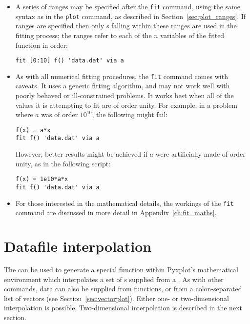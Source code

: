 \begin{itemize}
\item A series of ranges may be specified after the {\tt fit} command, using
the same syntax as in the {\tt plot} command, as described in
Section~\ref{sec:plot_ranges}. If ranges are specified then only \datapoint s
falling within these ranges are used in the fitting process; the ranges refer
to each of the $n$ variables of the fitted function in order:
\begin{verbatim}
fit [0:10] f() 'data.dat' via a
\end{verbatim}

\item As with all numerical fitting procedures, the {\tt fit} command comes
with caveats. It uses a generic fitting algorithm, and may not work well with
poorly behaved or ill-constrained problems. It works best when all of the
values it is attempting to fit are of order unity. For example, in a problem
where $a$ was of order $10^{10}$, the following might fail:
\begin{verbatim}
f(x) = a*x
fit f() 'data.dat' via a
\end{verbatim}
However, better results might be achieved if $a$ were artificially made of
order unity, as in the following script:
\begin{verbatim}
f(x) = 1e10*a*x
fit f() 'data.dat' via a
\end{verbatim}

\item For those interested in the mathematical details, the workings of the
{\tt fit} command are discussed in more detail in Appendix~\ref{ch:fit_maths}.

\end{itemize}

\section{Datafile interpolation}
\label{sec:spline_command}

The  can be used to generate a special function within
Pyxplot's mathematical environment which interpolates a set of \datapoint s
supplied from a \datafile. As with other commands, data can also be supplied
from functions, or from a colon-separated list of vectors (see
Section~\ref{sec:vectorplot}). Either one- or two-dimensional interpolation is
possible. Two-dimensional interpolation is described in the next section.

